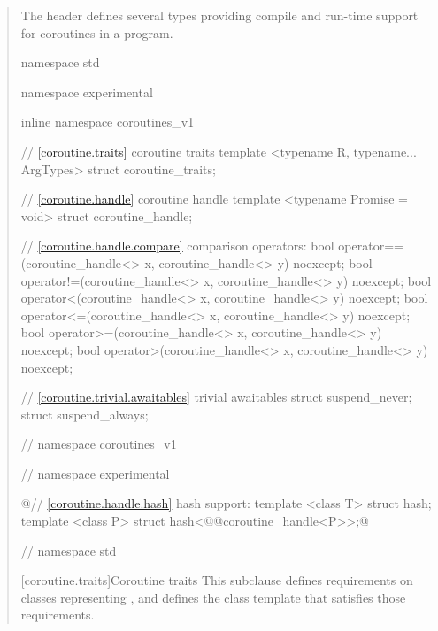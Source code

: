 \begin{quote}

\pnum
The header
defines several types providing compile and run-time support for coroutines in a \Cpp program.


%
%
\begin{codeblock}
namespace std {
namespace experimental {
inline namespace coroutines_v1 {

  // \ref{coroutine.traits} coroutine traits
  template <typename R, typename... ArgTypes>
    struct coroutine_traits;
  	
  // \ref{coroutine.handle} coroutine handle
  template <typename Promise = void>
    struct coroutine_handle;		
  
  // \ref{coroutine.handle.compare} comparison operators:	
  bool operator==(coroutine_handle<> x, coroutine_handle<> y) noexcept;
  bool operator!=(coroutine_handle<> x, coroutine_handle<> y) noexcept;
  bool operator<(coroutine_handle<> x, coroutine_handle<> y) noexcept;			
  bool operator<=(coroutine_handle<> x, coroutine_handle<> y) noexcept;			
  bool operator>=(coroutine_handle<> x, coroutine_handle<> y) noexcept;
  bool operator>(coroutine_handle<> x, coroutine_handle<> y) noexcept;
    
  // \ref{coroutine.trivial.awaitables} trivial awaitables
  struct suspend_never;
  struct suspend_always;
    
} // namespace coroutines_v1
} // namespace experimental

@\cbstart@// \ref{coroutine.handle.hash} hash support:
template <class T> struct hash;
template <class P> struct hash<@@coroutine_handle<P>>;@\cbend@

} // namespace std
\end{codeblock}

[coroutine.traits]{Coroutine traits}
\pnum
This subclause defines requirements on classes representing
,
and defines the class template
that satisfies those requirements.



\end{quote}
